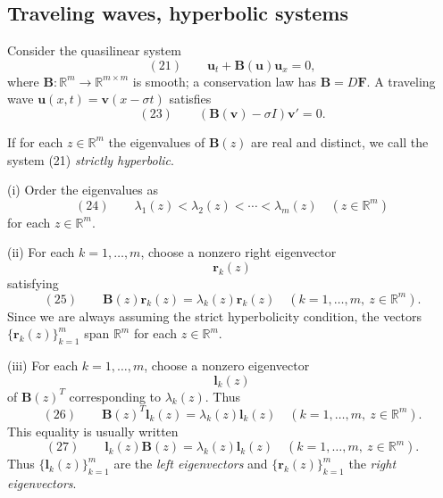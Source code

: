 \subsection{Traveling waves, hyperbolic systems}\label{sec:traveling-waves-hyperbolic-systems}

Consider the quasilinear system
\[
(21)\qquad \mathbf u_t+\mathbf B(\mathbf u)\mathbf u_x=0,
\]
where $\mathbf B:\mathbb R^m\to\mathbb R^{m\times m}$ is smooth; a conservation law has $\mathbf B=D\mathbf F$. A traveling wave $\mathbf u(x,t)=\mathbf v(x-\sigma t)$ satisfies
\[
(23)\qquad (\mathbf B(\mathbf v)-\sigma I)\mathbf v'=0.
\]

\begin{definition}
\label{def:strictly-hyperbolic-system}
If for each $z\in\mathbb{R}^m$ the eigenvalues of $\mathbf{B}(z)$ are real and distinct, we call the system (21) \textit{strictly hyperbolic}.
\end{definition}

\begin{definition}
\label{def:eigenvalue-eigenvector-notation-hyperbolic}

(i) Order the eigenvalues as
$$(24) \qquad \lambda_1(z) < \lambda_2(z) < \cdots < \lambda_m(z) \quad (z\in\mathbb{R}^m)$$
for each $z\in\mathbb R^m$.

(ii) For each $k=1,\ldots,m$, choose a nonzero right eigenvector
$$\mathbf{r}_k(z)$$
satisfying
$$(25) \qquad \mathbf{B}(z)\mathbf{r}_k(z) = \lambda_k(z)\mathbf{r}_k(z) \quad (k=1,\ldots,m,\ z\in\mathbb{R}^m).$$
Since we are always assuming the strict hyperbolicity condition, the vectors $\{\mathbf{r}_k(z)\}_{k=1}^m$ span $\mathbb{R}^m$ for each $z\in\mathbb{R}^m$.

(iii) For each $k=1,\ldots,m$, choose a nonzero eigenvector
$$\mathbf{l}_k(z)$$
of $\mathbf B(z)^T$ corresponding to $\lambda_k(z)$. Thus
$$(26) \qquad \mathbf{B}(z)^T\mathbf{l}_k(z) = \lambda_k(z)\mathbf{l}_k(z) \quad (k=1,\ldots,m,\ z\in\mathbb{R}^m).$$
This equality is usually written
$$(27) \qquad \mathbf{l}_k(z)\mathbf{B}(z) = \lambda_k(z)\mathbf{l}_k(z) \quad (k=1,\ldots,m,\ z\in\mathbb{R}^m).$$
Thus $\{\mathbf{l}_k(z)\}_{k=1}^m$ are the \textit{left eigenvectors} and $\{\mathbf{r}_k(z)\}_{k=1}^m$ the \textit{right eigenvectors}.
\end{definition}

